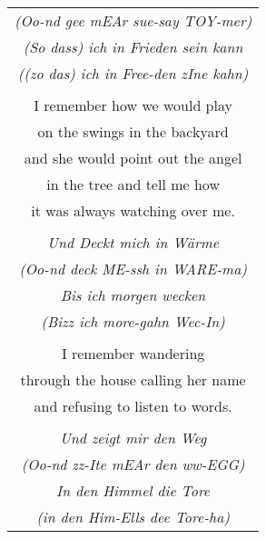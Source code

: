 \documentclass{article}
\begin{document}
\begin{center}
\begin{tabular}{c}
{\scriptsize\textit{(Oo-nd gee mEAr sue-say TOY-mer)}} \\
\textit{(So dass) ich in Frieden sein kann} \\
{\scriptsize\textit{((zo das) ich in Free-den zIne kahn)}} \\
\\
I remember how we would play \\
on the swings in the backyard \\
and she would point out the angel \\
in the tree and tell me how \\
it was always watching over me. \\
\\
\textit{Und Deckt mich in W{\"a}rme} \\
{\scriptsize\textit{(Oo-nd deck ME-ssh in WARE-ma)}} \\
\textit{Bis ich morgen wecken} \\
{\scriptsize\textit{(Bizz ich more-gahn Wec-In)}} \\
\\
I remember wandering \\
through the house calling her name \\
and refusing to listen to words. \\
\\
\textit{Und zeigt mir den Weg} \\
{\scriptsize\textit{(Oo-nd zz-Ite mEAr den ww-EGG)}} \\
\textit{In den Himmel die Tore} \\
{\scriptsize\textit{(in den Him-Ells dee Tore-ha)}} \\

\end{tabular}
\end{center}
\end{document}
